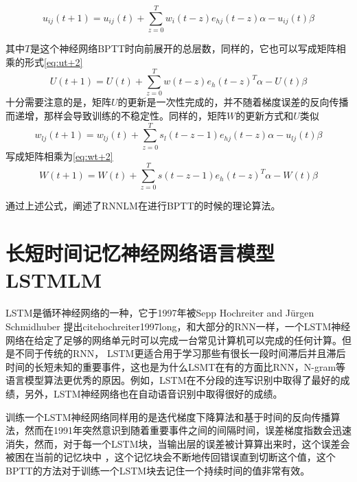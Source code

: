 \begin{equation}
	\label{eq:uijt+1}
   	{u_{ij}}\left( {t + 1} \right) = {u_{ij}}\left( t \right) + \sum\limits_{z = 0}^T {{w_i}\left( {t - z} \right){e_{hj}}\left( {t - z} \right)\alpha  - {u_{ij}}\left( t \right)\beta } 
\end{equation}

其中$T$是这个神经网络BPTT时向前展开的总层数，同样的，它也可以写成矩阵相乘的形式\ref{eq:ut+2}
\begin{equation}
	\label{eq:ut+2}
   	U\left( {t + 1} \right) = U\left( t \right) + \sum\limits_{z = 0}^T {w\left( {t - z} \right){e_h}{{\left( {t - z} \right)}^T}\alpha  - U\left( t \right)\beta } 
\end{equation}
十分需要注意的是，矩阵$U$的更新是一次性完成的，并不随着梯度误差的反向传播而递增，那样会导致训练的不稳定性。同样的，矩阵$W$的更新方式和$U$类似
\begin{equation}
	\label{eq:wlj}
   	{w_{lj}}\left( {t + 1} \right) = {w_{lj}}\left( t \right) + \sum\limits_{z = 0}^T {{s_l}\left( {t - z - 1} \right){e_{hj}}\left( {t - z} \right)\alpha  - {u_{lj}}\left( t \right)\beta } 
\end{equation}
写成矩阵相乘为\ref{eq:wt+2}
\begin{equation}
	\label{eq:wt+2}
   	W\left( {t + 1} \right) = W\left( t \right) + \sum\limits_{z = 0}^T {s\left( {t - z - 1} \right){e_h}{{\left( {t - z} \right)}^T}\alpha  - W\left( t \right)\beta } 
\end{equation}

通过上述公式，阐述了RNNLM在进行BPTT的时候的理论算法。


\section{长短时间记忆神经网络语言模型LSTMLM}
LSTM是循环神经网络的一种，它于1997年被Sepp Hochreiter and Jürgen Schmidhuber 提出cite{hochreiter1997long}，和大部分的RNN一样，一个LSTM神经网络在给定了足够的网络单元时可以完成一台常见计算机可以完成的任何计算。但是不同于传统的RNN， LSTM更适合用于学习那些有很长一段时间滞后并且滞后时间的长短未知的重要事件，这也是为什么LSMT在有的方面比RNN，N-gram等语言模型算法更优秀的原因。例如，LSTM在不分段的连写识别中取得了最好的成绩\cite{graves2009novel}，另外，LSTM神经网络也在自动语音识别中取得很好的成绩\cite{graves2013speech}。

训练一个LSTM神经网络同样用的是迭代梯度下降算法和基于时间的反向传播算法，然而在1991年突然意识到随着重要事件之间的间隔时间，误差梯度指数会迅速消失\cite{hochreiter1991untersuchungen}\cite{hochreiter2001gradient}，然而，对于每一个LSTM块，当输出层的误差被计算算出来时，这个误差会被困在当前的记忆块中 ，这个记忆块会不断地传回错误直到切断这个值，这个BPTT的方法对于训练一个LSTM块去记住一个持续时间的值非常有效。

